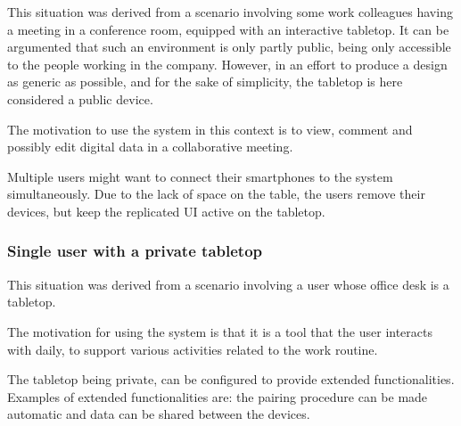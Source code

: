 This situation was derived from a scenario involving some work colleagues having a meeting in a conference room, equipped with an interactive tabletop.
It can be argumented that such an environment is only partly public, being only accessible to the people working in the company.
However, in an effort to produce a design as generic as possible, and for the sake of simplicity, the tabletop is here considered a public device.

The motivation to use the system in this context is to view, comment and possibly edit digital data in a collaborative meeting.

Multiple users might want to connect their smartphones to the system simultaneously.
Due to the lack of space on the table, the users remove their devices, but keep the replicated UI active on the tabletop.


\subsubsection{Single user with a private tabletop}

This situation was derived from a scenario involving a user whose office desk is a tabletop.

The motivation for using the system is that it is a tool that the user interacts with daily, to support various activities related to the work routine.

The tabletop being private, can be configured to provide extended functionalities.
Examples of extended functionalities are: the pairing procedure can be made automatic and data can be shared between the devices.


